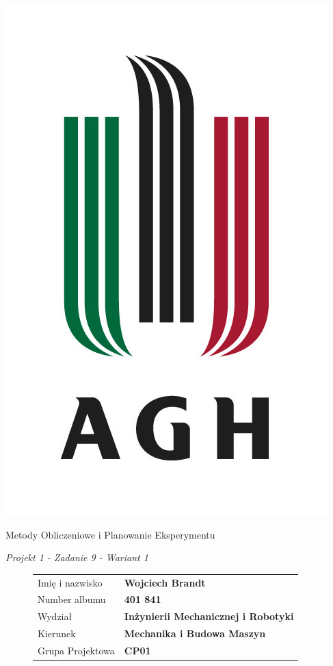 \documentclass[a4paper, 12pt]{mwart}
\begin{document}
	\begin{titlepage}
		\begin{center}
			\includegraphics[height = 0.6\textheight]{pictures/agh_znk_wbr_rgb_150ppi.jpg}

			\begin{HUGE}
				Metody Obliczeniowe
				i Planowanie Eksperymentu
				\vspace{0.8cm}

				\emph{Projekt 1 - Zadanie 9 - Wariant 1}
			\end{HUGE}

		\end{center}
		\begin{figure}[b]
			\begin{tabular}{m{4cm}l}
				Imię i nazwisko  & \textbf{Wojciech Brandt}\\
				Number albumu    & \textbf{401 841}\\
				Wydział          & \textbf{Inżynierii Mechanicznej i Robotyki}\\
				Kierunek         & \textbf{Mechanika i Budowa Maszyn}\\
				Grupa Projektowa & \textbf{CP01}
			\end{tabular}
		\end{figure}
	\end{titlepage}
\end{document}
